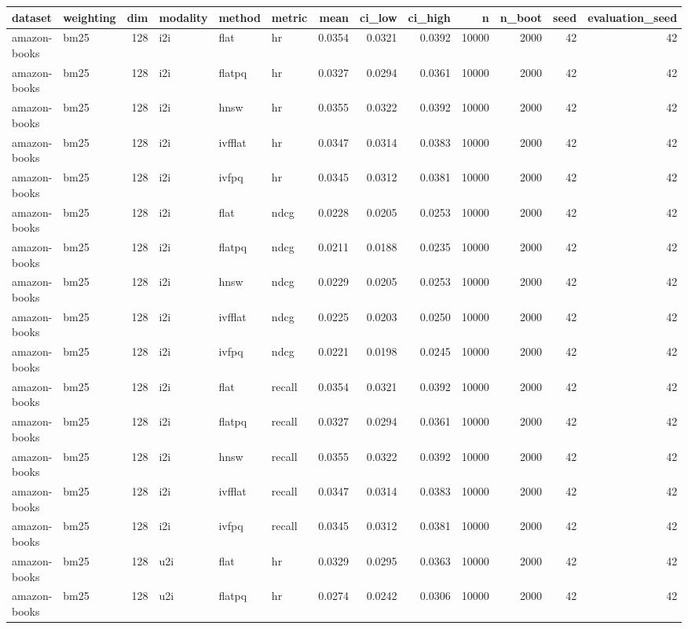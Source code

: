 \begin{tabular}{llrlllrrrrrrr}
\toprule
dataset & weighting & dim & modality & method & metric & mean & ci_low & ci_high & n & n_boot & seed & evaluation_seed \\
\midrule
amazon-books & bm25 & 128 & i2i & flat & hr & 0.0354 & 0.0321 & 0.0392 & 10000 & 2000 & 42 & 42 \\
amazon-books & bm25 & 128 & i2i & flatpq & hr & 0.0327 & 0.0294 & 0.0361 & 10000 & 2000 & 42 & 42 \\
amazon-books & bm25 & 128 & i2i & hnsw & hr & 0.0355 & 0.0322 & 0.0392 & 10000 & 2000 & 42 & 42 \\
amazon-books & bm25 & 128 & i2i & ivfflat & hr & 0.0347 & 0.0314 & 0.0383 & 10000 & 2000 & 42 & 42 \\
amazon-books & bm25 & 128 & i2i & ivfpq & hr & 0.0345 & 0.0312 & 0.0381 & 10000 & 2000 & 42 & 42 \\
amazon-books & bm25 & 128 & i2i & flat & ndcg & 0.0228 & 0.0205 & 0.0253 & 10000 & 2000 & 42 & 42 \\
amazon-books & bm25 & 128 & i2i & flatpq & ndcg & 0.0211 & 0.0188 & 0.0235 & 10000 & 2000 & 42 & 42 \\
amazon-books & bm25 & 128 & i2i & hnsw & ndcg & 0.0229 & 0.0205 & 0.0253 & 10000 & 2000 & 42 & 42 \\
amazon-books & bm25 & 128 & i2i & ivfflat & ndcg & 0.0225 & 0.0203 & 0.0250 & 10000 & 2000 & 42 & 42 \\
amazon-books & bm25 & 128 & i2i & ivfpq & ndcg & 0.0221 & 0.0198 & 0.0245 & 10000 & 2000 & 42 & 42 \\
amazon-books & bm25 & 128 & i2i & flat & recall & 0.0354 & 0.0321 & 0.0392 & 10000 & 2000 & 42 & 42 \\
amazon-books & bm25 & 128 & i2i & flatpq & recall & 0.0327 & 0.0294 & 0.0361 & 10000 & 2000 & 42 & 42 \\
amazon-books & bm25 & 128 & i2i & hnsw & recall & 0.0355 & 0.0322 & 0.0392 & 10000 & 2000 & 42 & 42 \\
amazon-books & bm25 & 128 & i2i & ivfflat & recall & 0.0347 & 0.0314 & 0.0383 & 10000 & 2000 & 42 & 42 \\
amazon-books & bm25 & 128 & i2i & ivfpq & recall & 0.0345 & 0.0312 & 0.0381 & 10000 & 2000 & 42 & 42 \\
amazon-books & bm25 & 128 & u2i & flat & hr & 0.0329 & 0.0295 & 0.0363 & 10000 & 2000 & 42 & 42 \\
amazon-books & bm25 & 128 & u2i & flatpq & hr & 0.0274 & 0.0242 & 0.0306 & 10000 & 2000 & 42 & 42 \\

\end{tabular}
